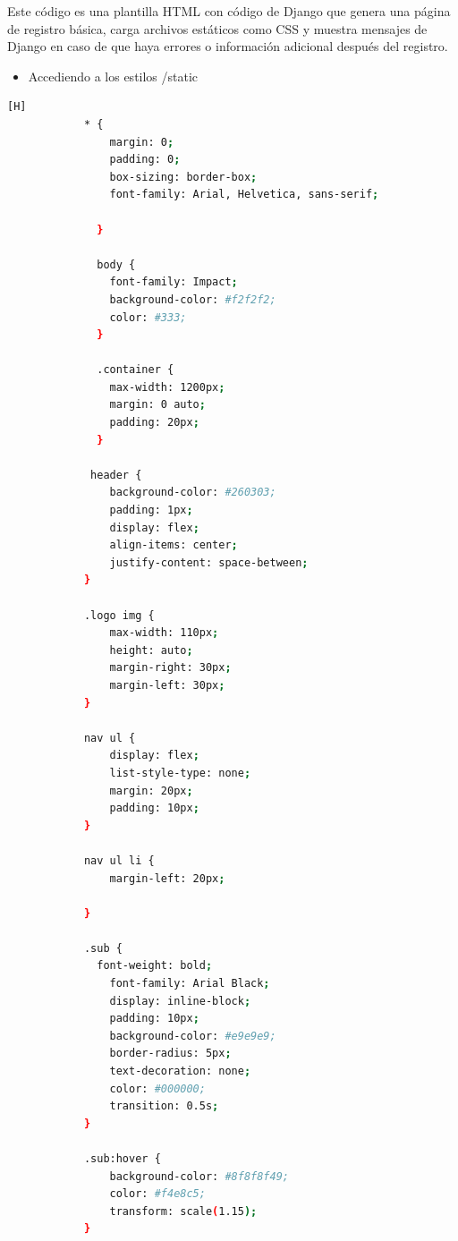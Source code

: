 \documentclass{article}
\begin{document}
Este código es una plantilla HTML con código de Django que genera una página de registro básica, carga archivos estáticos como CSS y muestra mensajes de Django en caso de que haya errores o información adicional después del registro.
        \begin{itemize}
            \item Accediendo a los estilos /static
        \end{itemize}
        \begin{lstlisting}[language=bash,caption={styles.css}][H]
            * {
                margin: 0;
                padding: 0;
                box-sizing: border-box;
                font-family: Arial, Helvetica, sans-serif;
            
              }
              
              body {
                font-family: Impact;
                background-color: #f2f2f2;
                color: #333;
              }
              
              .container {
                max-width: 1200px;
                margin: 0 auto;
                padding: 20px;
              }
              
             header {
                background-color: #260303;
                padding: 1px;
                display: flex;
                align-items: center;
                justify-content: space-between;
            }
            
            .logo img {
                max-width: 110px;
                height: auto;
                margin-right: 30px;
                margin-left: 30px;
            }
            
            nav ul {
                display: flex;
                list-style-type: none;
                margin: 20px;
                padding: 10px;
            }
            
            nav ul li {
                margin-left: 20px;
            
            }
            
            .sub {
              font-weight: bold;
                font-family: Arial Black;
                display: inline-block;
                padding: 10px;
                background-color: #e9e9e9;
                border-radius: 5px;
                text-decoration: none;
                color: #000000;
                transition: 0.5s;
            }
            
            .sub:hover {
                background-color: #8f8f8f49;
                color: #f4e8c5;
                transform: scale(1.15);
            }
            

\end{lstlisting}
\end{document}
